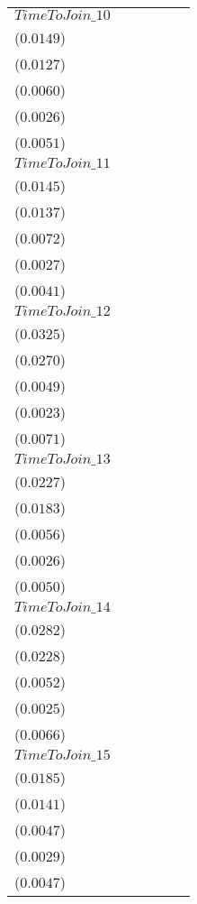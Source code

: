 \begin{tabular}{llllll}
$TimeToJoin\_10$  &     \makecell{$0.0242^{}$ \\ ($0.0149$)} &     \makecell{$0.0192^{}$ \\ ($0.0127$)} &  \makecell{$-0.0213^{***}$ \\ ($0.0060$)} &  \makecell{$-0.0144^{***}$ \\ ($0.0026$)} &    \makecell{$0.0090^{*}$ \\ ($0.0051$)} \\
$TimeToJoin\_11$  &     \makecell{$0.0213^{}$ \\ ($0.0145$)} &     \makecell{$0.0183^{}$ \\ ($0.0137$)} &  \makecell{$-0.0212^{***}$ \\ ($0.0072$)} &  \makecell{$-0.0156^{***}$ \\ ($0.0027$)} &   \makecell{$0.0098^{**}$ \\ ($0.0041$)} \\
$TimeToJoin\_12$  &     \makecell{$0.0335^{}$ \\ ($0.0325$)} &     \makecell{$0.0267^{}$ \\ ($0.0270$)} &  \makecell{$-0.0235^{***}$ \\ ($0.0049$)} &  \makecell{$-0.0152^{***}$ \\ ($0.0023$)} &     \makecell{$0.0113^{}$ \\ ($0.0071$)} \\
$TimeToJoin\_13$  &     \makecell{$0.0227^{}$ \\ ($0.0227$)} &     \makecell{$0.0175^{}$ \\ ($0.0183$)} &  \makecell{$-0.0213^{***}$ \\ ($0.0056$)} &  \makecell{$-0.0140^{***}$ \\ ($0.0026$)} &    \makecell{$0.0093^{*}$ \\ ($0.0050$)} \\
$TimeToJoin\_14$  &     \makecell{$0.0353^{}$ \\ ($0.0282$)} &     \makecell{$0.0275^{}$ \\ ($0.0228$)} &  \makecell{$-0.0178^{***}$ \\ ($0.0052$)} &  \makecell{$-0.0129^{***}$ \\ ($0.0025$)} &     \makecell{$0.0103^{}$ \\ ($0.0066$)} \\
$TimeToJoin\_15$  &     \makecell{$0.0234^{}$ \\ ($0.0185$)} &     \makecell{$0.0175^{}$ \\ ($0.0141$)} &  \makecell{$-0.0174^{***}$ \\ ($0.0047$)} &  \makecell{$-0.0117^{***}$ \\ ($0.0029$)} &    \makecell{$0.0082^{*}$ \\ ($0.0047$)} \\

\end{tabular}
